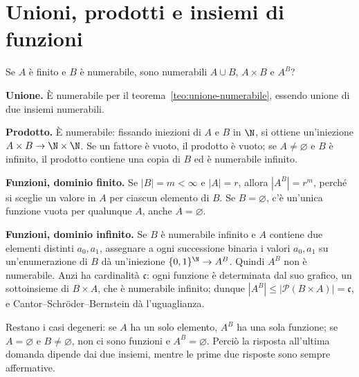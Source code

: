 \section{Unioni, prodotti e insiemi di funzioni}
\begin{esercizio}
Se $A$ è finito e $B$ è numerabile, sono numerabili $A\cup B$, $A\times B$ e $A^B$?
\end{esercizio}
\begin{svolgimento}
\textbf{Unione.} È numerabile per il teorema~\ref{teo:unione-numerabile}, essendo unione di due insiemi numerabili.

\textbf{Prodotto.} È numerabile: fissando iniezioni di $A$ e $B$ in $\N$, si ottiene un'iniezione $A\times B\to\N\times\N$. Se un fattore è vuoto, il prodotto è vuoto; se $A\ne\varnothing$ e $B$ è infinito, il prodotto contiene una copia di $B$ ed è numerabile infinito.

\textbf{Funzioni, dominio finito.} Se $|B|=m<\infty$ e $|A|=r$, allora $|A^B|=r^m$, perché si sceglie un valore in $A$ per ciascun elemento di $B$. Se $B=\varnothing$, c'è un'unica funzione vuota per qualunque $A$, anche $A=\varnothing$.

\textbf{Funzioni, dominio infinito.} Se $B$ è numerabile infinito e $A$ contiene due elementi distinti $a_0,a_1$, assegnare a ogni successione binaria i valori $a_0,a_1$ su un'enumerazione di $B$ dà un'iniezione $\{0,1\}^{\N}\to A^B$. Quindi $A^B$ non è numerabile. Anzi ha cardinalità $\mathfrak c$: ogni funzione è determinata dal suo grafico, un sottoinsieme di $B\times A$, che è numerabile infinito; dunque $|A^B|\le|\mathcal P(B\times A)|=\mathfrak c$, e Cantor--Schröder--Bernstein dà l'uguaglianza.

Restano i casi degeneri: se $A$ ha un solo elemento, $A^B$ ha una sola funzione; se $A=\varnothing$ e $B\ne\varnothing$, non ci sono funzioni e $A^B=\varnothing$. Perciò la risposta all'ultima domanda dipende dai due insiemi, mentre le prime due risposte sono sempre affermative.
\end{svolgimento}

